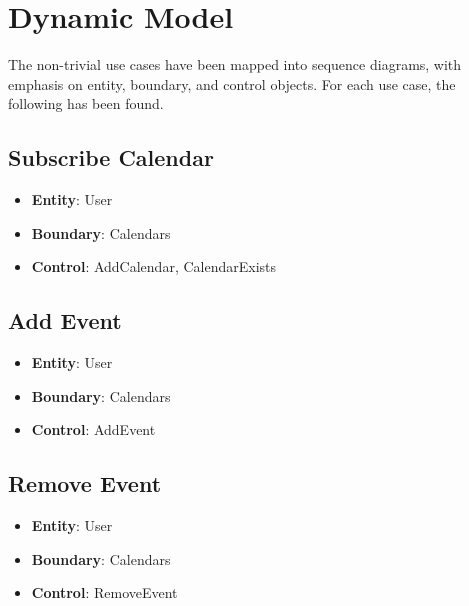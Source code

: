 \section{Dynamic Model}
The non-trivial use cases have been mapped into sequence diagrams, with emphasis
on entity, boundary, and control objects. For each use case, the following has
been found.

\subsection{Subscribe Calendar}
\begin{itemize}
\item \textbf{Entity}: User
\item \textbf{Boundary}: Calendars
\item \textbf{Control}: AddCalendar, CalendarExists
\end{itemize}

\subsection{Add Event}
\begin{itemize}
\item \textbf{Entity}: User
\item \textbf{Boundary}: Calendars
\item \textbf{Control}: AddEvent
\end{itemize}

\subsection{Remove Event}
\begin{itemize}
\item \textbf{Entity}: User
\item \textbf{Boundary}: Calendars
\item \textbf{Control}: RemoveEvent
\end{itemize}
